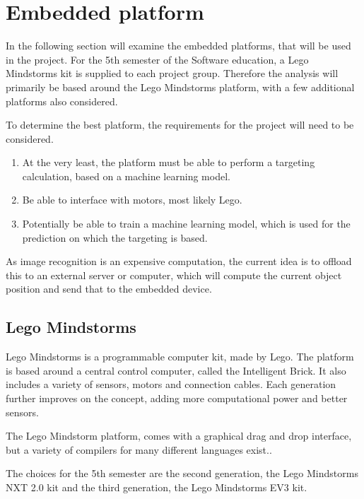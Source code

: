 \section{Embedded platform}
In the following section will examine the embedded platforms, that will be used in the project.
For the 5th semester of the Software education, a Lego Mindstorms kit is supplied to each project group.
Therefore the analysis will primarily be based around the Lego Mindstorms platform, with a few additional platforms also considered.

To determine the best platform, the requirements for the project will need to be considered.
\begin{enumerate}
	\item At the very least, the platform must be able to perform a targeting calculation, based on a machine learning model.
	\item Be able to interface with motors, most likely Lego.
	\item Potentially be able to train a machine learning model, which is used for the prediction on which the targeting is based.
\end{enumerate}

As image recognition is an expensive computation, the current idea is to offload this to an external server or computer, which will compute the current object position and send that to the embedded device.

\subsection{Lego Mindstorms}
Lego Mindstorms is a programmable computer kit, made by Lego.
The platform is based around a central control computer, called the Intelligent Brick.
It also includes a variety of sensors, motors and connection cables.
Each generation further improves on the concept, adding more computational power and better sensors.

The Lego Mindstorm platform, comes with a graphical drag and drop interface, but a variety of compilers for many different languages exist..

The choices for the 5th semester are the second generation, the Lego Mindstorms NXT 2.0 kit and the third generation, the Lego Mindstorms EV3 kit.

